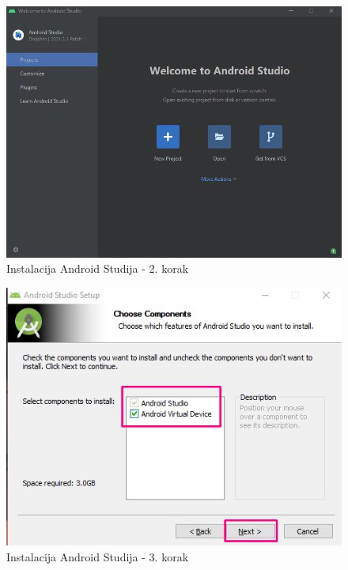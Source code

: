 \documentclass[11pt,a4paper,twoside]{article}
\begin{document}
\begin{figure}[!h]
	\centering
	\includegraphics[width=\textwidth]{install_02.png}
	\caption{Instalacija Android Studija - 2. korak}
	\label{fig:install_02}	
\end{figure}

\begin{figure}[!h]
	\centering
	\includegraphics{install_03.png}
	\caption{Instalacija Android Studija - 3. korak}
	\label{fig:install_03}	
\end{figure}
\end{document}

